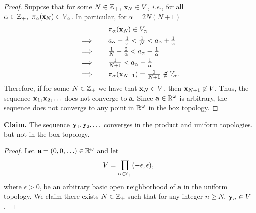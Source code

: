 \begin{solution}
\begin{proof}
        Suppose that for some $N \in \mathbb{Z}_+$, $\mathbf{x}_N \in V$, \textit{i.e.}, for all $\alpha \in \mathbb{Z}_+,~ \pi_\alpha(\mathbf{x}_N) \in V_\alpha$.
        In particular, for $\alpha = 2 N (N + 1)$
        \begin{alignat*}{2}
            &           && \quad \pi_\alpha(\mathbf{x}_N) \in V_\alpha \\
            & \implies  && \quad a_\alpha - \tfrac{1}{\alpha} < \tfrac{1}{N} < a_\alpha + \tfrac{1}{\alpha} \\
            & \implies  && \quad \tfrac{1}{N} - \tfrac{2}{\alpha} < a_\alpha - \tfrac{1}{\alpha} \\
            & \implies  && \quad \tfrac{1}{N + 1} < a_\alpha - \tfrac{1}{\alpha} \\
            & \implies  && \quad \pi_\alpha(\mathbf{x}_{N+1}) = \tfrac{1}{N+1} \not\in V_\alpha.
        \end{alignat*}
        Therefore, if for some $N \in \mathbb{Z}_+$ we have that $\mathbf{x}_N \in V$, then $\mathbf{x}_{N+1} \not\in V$.
        Thus, the sequence $\mathbf{x}_1, \mathbf{x}_2, \ldots$ does not converge to $\mathbf{a}$.
        Since $\mathbf{a} \in \mathbb{R}^\omega$ is arbitrary, the sequence does not converge to any point in $\mathbb{R}^\omega$ in the box topology.
    \end{proof}
    \bigskip

    \textbf{Claim.} The sequence $\mathbf{y}_1, \mathbf{y}_2, \ldots$ converges in the product and uniform topologies, but not in the box topology.
    \begin{proof}
        Let $\mathbf{a} = (0, 0, \ldots) \in \mathbb{R}^\omega$ and let
        \begin{equation*}
            V = \prod_{\alpha \in \mathbb{Z}_+} (-\epsilon, \epsilon),
        \end{equation*}
        where $\epsilon > 0$, be an arbitrary basic open neighborhood of $\mathbf{a}$ in the uniform topology.
        We claim there exists $N \in \mathbb{Z}_+$ such that for any integer $n \geq N$, $\mathbf{y}_n \in V$.


\end{proof}
\end{solution}
